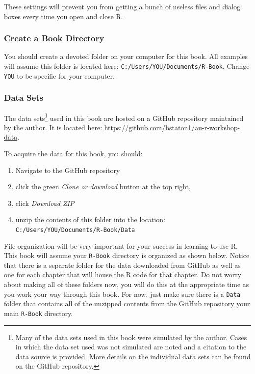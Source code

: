 \documentclass[]{book}
\providecommand{\tightlist}{%
  \setlength{\itemsep}{0pt}\setlength{\parskip}{0pt}}
\let\rmarkdownfootnote\footnote%
\def\footnote{\protect\rmarkdownfootnote}
\theoremstyle{definition}
\theoremstyle{definition}
\theoremstyle{definition}
\theoremstyle{remark}
\begin{document}
These settings will prevent you from getting a bunch of useless files
and dialog boxes every time you open and close R.

\subsubsection*{Create a Book Directory}\label{create-a-book-directory}

You should create a devoted folder on your computer for this book. All
examples will assume this folder is located here:
\texttt{C:/Users/YOU/Documents/R-Book}. Change \texttt{YOU} to be
specific for your computer.

\hypertarget{data-sets}{\subsubsection*{Data Sets}\label{data-sets}}

The data sets\footnote{Many of the data sets used in this book were
  simulated by the author. Cases in which the data set used was not
  simulated are noted and a citation to the data source is provided.
  More details on the individual data sets can be found on the GitHub
  repository.} used in this book are hosted on a GitHub repository
maintained by the author. It is located here:
\url{https://github.com/bstaton1/au-r-workshop-data}.

To acquire the data for this book, you should:

\begin{enumerate}
\def\labelenumi{\arabic{enumi}.}
\tightlist
\item
  Navigate to the GitHub repository
\item
  click the green \emph{Clone or download} button at the top right,
\item
  click \emph{Download ZIP}
\item
  unzip the contents of this folder into the location:
  \texttt{C:/Users/YOU/Documents/R-Book/Data}
\end{enumerate}

File organization will be very important for your success in learning to
use R. This book will assume your \texttt{R-Book} directory is organized
as shown below. Notice that there is a separate folder for the data
downloaded from GitHub as well as one for each chapter that will house
the R code for that chapter. Do not worry about making all of these
folders now, you will do this at the appropriate time as you work your
way through this book. For now, just make sure there is a \texttt{Data}
folder that contains all of the unzipped contents from the GitHub
repository your main \texttt{R-Book} directory.
\end{document}
